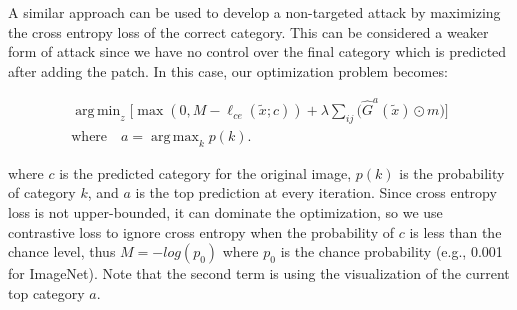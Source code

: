 \documentclass[10pt,twocolumn,letterpaper]{article}
\DeclareMathOperator*{\argmax}{arg\,max}
\DeclareMathOperator*{\argmin}{arg\,min}
\begin{document}
A similar approach can be used to develop a non-targeted attack by maximizing the cross entropy loss of the correct category. This can be considered a weaker form of attack since we have no control over the final category which is predicted after adding the patch. In this case, our optimization problem becomes:


\begin{equation}
\begin{split}
     \argmin_{z}\Big[\max(0, M -\ell_{ce}(\tilde x; c)) + \lambda \sum_{ij} \big(\hat{G}^a(\tilde x) \odot m\big)\Big ] \\ \text{where} \quad a=\argmax_k{p(k)}. \nonumber
\end{split}
\end{equation}


\noindent where $c$ is the predicted category for the original image, $p(k)$ is the probability of category $k$, and $a$ is the top prediction at every iteration. Since cross entropy loss is not upper-bounded, it can dominate the optimization, so we use contrastive loss \cite{hadsell2006dimensionality} to ignore cross entropy  when the probability of $c$ is less than the chance level, thus $M=-log(p_0)$ where $p_0$ is the chance probability (e.g., 0.001 for ImageNet). Note that the second term is using the visualization of the current top category $a$.
\end{document}
